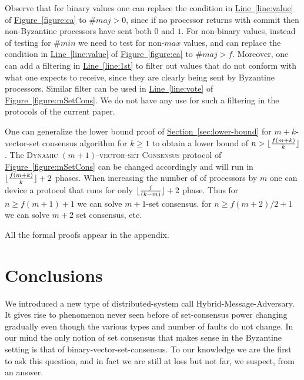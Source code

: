 \documentclass[11pt]{article}
\newcommand{\namedref}[2]{\hyperref[#2]{#1~\ref*{#2}}}
\newcommand{\sectionref}[1]{\namedref{Section}{#1}}
\newcommand{\figureref}[1]{\namedref{Figure}{#1}}
\newcommand{\lref}[1]{\namedref{Line}{#1}}
\newcommand{\mSetCons}{\textsc{Dynamic $(m+1)$-vector-set Consensus}\xspace}
\begin{document}
Observe that for binary values one can replace the condition in \lref{line:value} of \figureref{figure:ca} to $\#maj>0$,  since if  no processor returns with {\sc commit} then  non-Byzantine processors have sent both $0$ and $1$.  
For non-binary values, instead of testing for $\#min$ we need to test for non-$max$ values,
and can replace the condition in \lref{line:value} of \figureref{figure:ca} to $\#maj>f$.
Moreover, 
one can  add a filtering  in \lref{line:1st}  to filter out values that do not conform with what one expects to receive, since they are clearly being sent by Byzantine processors.
Similar filter can be used in \lref{line:vote} of \figureref{figure:mSetCons}. 
We do not have any use for such a filtering in the protocols of the current paper.



One can generalize the lower bound proof of \sectionref{sec:lower-bound} for
$m+k$-vector-set consensus algorithm for $k \ge 1$ to obtain a lower bound of $n> \lfloor{f(m+k)\over k}\rfloor$.  
The \mSetCons protocol of
\figureref{figure:mSetCons} can be changed accordingly and will run in $ \lfloor{f(m+k)\over k}\rfloor+2$ phases. 
When increasing the number of of processors by $m$ one can device a protocol that runs 
for only $ \lfloor{f\over (k-m)}\rfloor +2$ phase.  Thus for $n \geq f(m+1)+1$ we can solve $m+1$-set consensus.
for $n \geq f(m+2)/2 +1$ we can solve $m+2$ set consensus, etc. 



All the formal proofs appear in the appendix.






















 \section{Conclusions}

We introduced a new type of distributed-system call Hybrid-Message-Adversary.
It gives rise to phenomenon never seen before of set-consensus power changing gradually
even though the various types and number of faults do not change.
In our mind the only notion of set consensus that makes sense
in the Byzantine setting is that of binary-vector-set-consensus.
To our knowledge we are the first to ask this question, and in fact we
are still at loss but not far, we suspect, from an answer.
\end{document}
